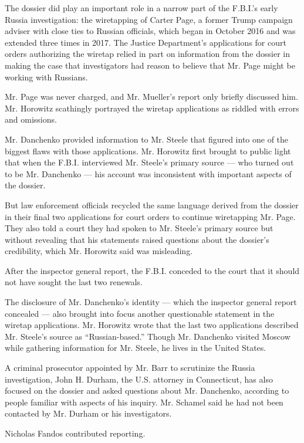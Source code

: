 The dossier did play an important role in a narrow part of the F.B.I.'s
early Russia investigation: the wiretapping of Carter Page, a former
Trump campaign adviser with close ties to Russian officials, which began
in October 2016 and was extended three times in 2017. The Justice
Department's applications for court orders authorizing the wiretap
relied in part on information from the dossier in making the case that
investigators had reason to believe that Mr. Page might be working with
Russians.

Mr. Page was never charged, and Mr. Mueller's report only briefly
discussed him. Mr. Horowitz scathingly portrayed the wiretap
applications as riddled with errors and omissions.

Mr. Danchenko provided information to Mr. Steele that figured into one
of the biggest flaws with those applications. Mr. Horowitz first brought
to public light that when the F.B.I. interviewed Mr. Steele's primary
source --- who turned out to be Mr. Danchenko --- his account was
inconsistent with important aspects of the dossier.

But law enforcement officials recycled the same language derived from
the dossier in their final two applications for court orders to continue
wiretapping Mr. Page. They also told a court they had spoken to Mr.
Steele's primary source but without revealing that his statements raised
questions about the dossier's credibility, which Mr. Horowitz said was
misleading.

After the inspector general report, the F.B.I. conceded to the court
that it should not have sought the last two renewals.

The disclosure of Mr. Danchenko's identity --- which the inspector
general report concealed --- also brought into focus another
questionable statement in the wiretap applications. Mr. Horowitz wrote
that the last two applications described Mr. Steele's source as
``Russian-based.'' Though Mr. Danchenko visited Moscow while gathering
information for Mr. Steele, he lives in the United States.

A criminal prosecutor appointed by Mr. Barr to scrutinize the Russia
investigation, John H. Durham, the U.S. attorney in Connecticut, has
also focused on the dossier and asked questions about Mr. Danchenko,
according to people familiar with aspects of his inquiry. Mr. Schamel
said he had not been contacted by Mr. Durham or his investigators.

Nicholas Fandos contributed reporting.


